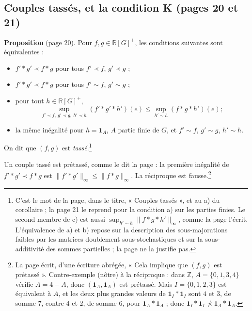 \documentclass[11pt,a4paper]{article}
\begin{document}
\subsection*{Couples tassés, et la condition K (pages 20 et 21)}

\textbf{Proposition} (page 20). Pour $f, g \in \mathbb{R}[G]^+$, les
conditions suivantes sont équivalentes :
\begin{itemize}
  \item[a)] $f' * g' \prec f * g$ pour tous $f' \prec f$, $g' \prec g$ ;
  \item[b)] $f' * g' \prec f * g$ pour tous $f' \sim f$, $g' \sim g$ ;
  \item[c)] pour tout $h \in \mathbb{R}[G]^+$,
  \[
  \sup_{f' \prec f,\ g' \prec g,\ h' \prec h} (f' * g' * h')(e)
  \leqslant \sup_{h' \sim h} (f * g * h')(e) ;
  \]
  \item[c')] la même inégalité pour $h = \mathbf{1}_A$, $A$ partie finie de
  $G$, et $f' \sim f$, $g' \sim g$, $h' \sim h$.
\end{itemize}
On dit que $(f, g)$ est \emph{tassé}.\footnote{C'est le mot de la page, dans
le titre, « Couples tassés », et au a) du corollaire ; la page 21 le reprend
pour la condition a) sur les parties finies. Le second membre
de c) est aussi $\sup_{h' \sim h} \|f * g * h'\|_\infty$, comme la page
l'écrit. L'équivalence de a) et b) repose sur la description des
sous-majorations faibles par les matrices doublement sous-stochastiques et
sur la sous-additivité des sommes partielles ; la page ne la justifie pas.}

Un couple tassé est prétassé, comme le dit la page : la première inégalité
de $f' * g' \prec f * g$ est
$\|f' * g'\|_\infty \leqslant \|f * g\|_\infty$. La réciproque est
fausse.\footnote{La page écrit, d'une écriture abrégée, « Cela implique que
$(f, g)$ est prétassé ». Contre-exemple (nôtre) à la réciproque :
dans $\mathbb{Z}$, $A = \{0, 1, 3, 4\}$ vérifie $A = 4 - A$, donc
$(\mathbf{1}_A, \mathbf{1}_A)$ est prétassé. Mais $I = \{0, 1, 2, 3\}$ est
équivalent à $A$, et les deux plus grandes valeurs de
$\mathbf{1}_I * \mathbf{1}_I$ sont $4$ et $3$, de somme $7$, contre $4$ et
$2$, de somme $6$, pour $\mathbf{1}_A * \mathbf{1}_A$ ; donc
$\mathbf{1}_I * \mathbf{1}_I \not\prec \mathbf{1}_A * \mathbf{1}_A$.}
\end{document}
